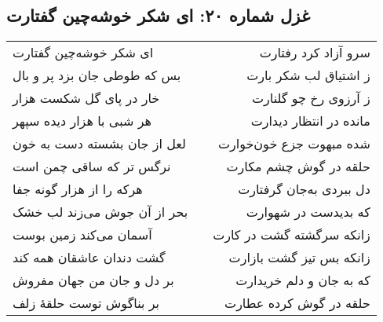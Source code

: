 \begin{center}
\section*{غزل شماره ۲۰: ای شکر خوشه‌چین گفتارت}
\label{sec:020}
\begin{longtable}{l p{0.5cm} r}
ای شکر خوشه‌چین گفتارت
&&
سرو آزاد کرد رفتارت
\\
بس که طوطی جان بزد پر و بال
&&
ز اشتیاق لب شکر بارت
\\
خار در پای گل شکست هزار
&&
ز آرزوی رخ چو گلنارت
\\
هر شبی با هزار دیده سپهر
&&
مانده در انتظار دیدارت
\\
لعل از جان بشسته دست به خون
&&
شده مبهوت جزع خون‌خوارت
\\
نرگس تر که ساقی چمن است
&&
حلقه در گوش چشم مکارت
\\
هرکه را از هزار گونه جفا
&&
دل ببردی به‌جان گرفتارت
\\
بحر از آن جوش می‌زند لب خشک
&&
که بدیدست در شهوارت
\\
آسمان می‌کند زمین بوست
&&
زانکه سرگشته گشت در کارت
\\
گشت دندان عاشقان همه کند
&&
زانکه بس تیز گشت بازارت
\\
بر دل و جان من جهان مفروش
&&
که به جان و دلم خریدارت
\\
بر بناگوش توست حلقهٔ زلف
&&
حلقه در گوش کرده عطارت
\\
\end{longtable}
\end{center}
